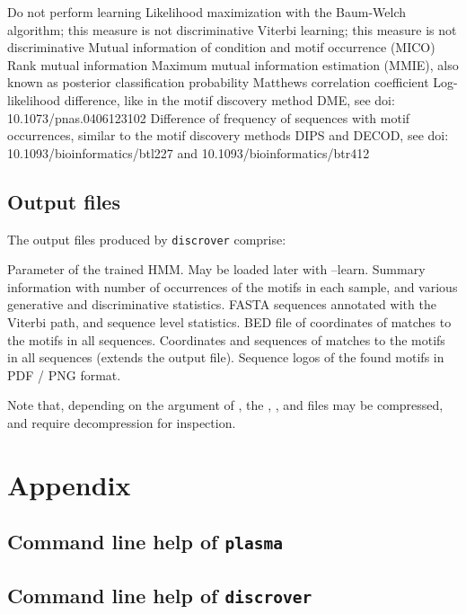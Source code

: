 \documentclass[a4paper]{article}
\newcommand{\plasma}[0]{\texttt{plasma}}
\newcommand{\discrover}[0]{\texttt{discrover}}
\begin{document}
\begin{description}
    Do not perform learning
    Likelihood maximization with the Baum-Welch algorithm; this measure is not discriminative
    Viterbi learning; this measure is not discriminative
    Mutual information of condition and motif occurrence (MICO)
    Rank mutual information
    Maximum mutual information estimation (MMIE), also known as posterior classification probability
    Matthews correlation coefficient
    Log-likelihood difference, like in the motif discovery method DME, see doi: 10.1073/pnas.0406123102
    Difference of frequency of sequences with motif occurrences, similar to the motif discovery methods DIPS and DECOD, see doi: 10.1093/bioinformatics/btl227 and 10.1093/bioinformatics/btr412
\end{description}

\subsection{Output files}
The output files produced by \discrover{} comprise:

\begin{description}
    Parameter of the trained HMM\@.
    May be loaded later with --learn.
    Summary information with number of occurrences of the motifs in each sample, and various generative and discriminative statistics.
    FASTA sequences annotated with the Viterbi path, and sequence level statistics.
    BED file of coordinates of matches to the motifs in all sequences.
    Coordinates and sequences of matches to the motifs in all sequences (extends the  output file).
    Sequence logos of the found motifs in PDF / PNG format.
\end{description}

Note that, depending on the argument of , the , , and  files may be compressed, and require decompression for inspection.


\section{Appendix}
\subsection{Command line help of \plasma{}}
\label{appendix:plasma-cli-help}
{%
  \footnotesize
  
}

\subsection{Command line help of \discrover{}}
\label{appendix:discrover-cli-help}
{%
  \footnotesize
  
}



\nocite{*}
{}


\end{document}
